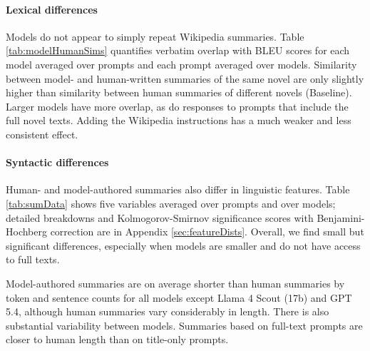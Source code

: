 \documentclass{article} %
\begin{document}
\paragraph{Lexical differences}
Models do not appear to simply repeat Wikipedia summaries.
Table \ref{tab:modelHumanSims} quantifies verbatim overlap with BLEU scores for each model averaged over prompts and each prompt averaged over models.
Similarity between model- and human-written summaries of the same novel are only slightly higher than similarity between human summaries of different novels (Baseline).
Larger models have more overlap, as do responses to prompts that include the full novel texts.
Adding the Wikipedia instructions has a much weaker and less consistent effect.

\paragraph{Syntactic differences}
Human- and model-authored summaries also differ in linguistic features.
Table \ref{tab:sumData} shows five variables averaged over prompts and over models; detailed breakdowns and Kolmogorov-Smirnov significance scores with Benjamini-Hochberg correction \citep{benjamini1995controlling} are in Appendix \ref{sec:featureDists}.
Overall, we find small but significant differences, especially when models are smaller and do not have access to full texts.

Model-authored summaries are on average shorter than human summaries by token and sentence counts for all models except Llama 4 Scout (17b) and GPT 5.4, although human summaries vary considerably in length.
There is also substantial variability between models.
Summaries based on full-text prompts are closer to human length than on title-only prompts.
\end{document}
